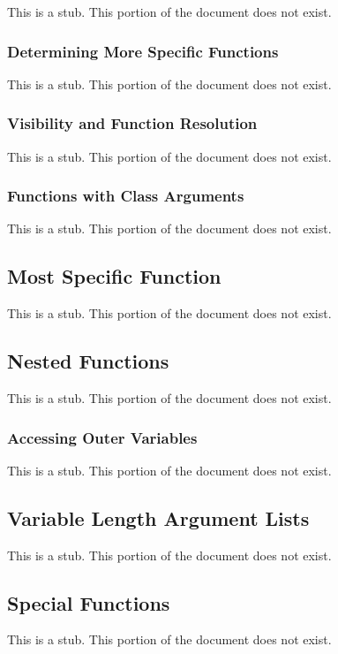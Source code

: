 This is a stub.  This portion of the document does not exist.

\subsubsection{Determining More Specific Functions}
\label{Determining_More_Specific_Functions}

This is a stub.  This portion of the document does not exist.

\subsubsection{Visibility and Function Resolution}
\label{Visibility_and_Function_Resolution}

This is a stub.  This portion of the document does not exist.

\subsubsection{Functions with Class Arguments}
\label{Functions_with_Class_Arguments}

This is a stub.  This portion of the document does not exist.

\subsection{Most Specific Function}
\label{Most_Specific_Function}

This is a stub.  This portion of the document does not exist.

\subsection{Nested Functions}
\label{Nested_Functions}

This is a stub.  This portion of the document does not exist.

\subsubsection{Accessing Outer Variables}
\label{Accessing_Outer_Variables}

This is a stub.  This portion of the document does not exist.

\subsection{Variable Length Argument Lists}
\label{Variable_Length_Argument_Lists}

This is a stub.  This portion of the document does not exist.

\subsection{Special Functions}
\label{Special_Functions}

This is a stub.  This portion of the document does not exist.
